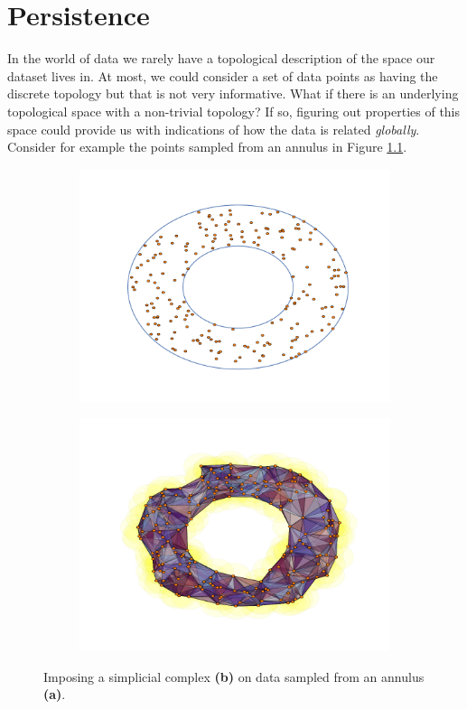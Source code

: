 \chapter{Persistence}
In the world of data we rarely have a topological description of the space our dataset lives in. At most, we could consider a set of data points as having the discrete topology but that is not very informative. What if there is an underlying topological space with a non-trivial topology? If so, figuring out properties of this space could provide us with indications of how the data is related \textit{globally}. Consider for example the points sampled from an annulus in Figure \ref{annulus:points}.

\begin{figure}[ht]
  \centering
  \begin{subfigure}[t]{.5\linewidth}
    \includegraphics[scale=.45]{annulus.pdf}
    \caption{\label{annulus:points}}
 \end{subfigure}%
  \begin{subfigure}[t]{.5\linewidth}
    \includegraphics[scale=.45]{annulus_rips.pdf}
    \caption{\label{annulus:imposed}}
 \end{subfigure}
  \caption{\label{annulus} Imposing a simplicial complex \textbf{(b)} on data sampled from an annulus \textbf{(a)}.}
\end{figure}

